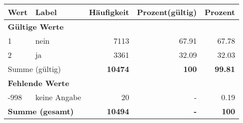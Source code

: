      \begin{longtable}{lXrrr}
     \toprule
     \textbf{Wert} & \textbf{Label} & \textbf{Häufigkeit} & \textbf{Prozent(gültig)} & \textbf{Prozent} \\
     \endhead
     \midrule
     \multicolumn{5}{l}{\textbf{Gültige Werte}}\\

     1 &
     \multicolumn{1}{X}{ nein   } &


       \num{7113} &
       \num[round-mode=places,round-precision=2]{67.91} &
         \num[round-mode=places,round-precision=2]{67.78} \\

     2 &
     \multicolumn{1}{X}{ ja   } &


       \num{3361} &
       \num[round-mode=places,round-precision=2]{32.09} &
         \num[round-mode=places,round-precision=2]{32.03} \\
     \midrule
     \multicolumn{2}{l}{Summe (gültig)} &
       \textbf{\num{10474}} &
     \textbf{\num{100}} &
       \textbf{\num[round-mode=places,round-precision=2]{99.81}} \\
     \multicolumn{5}{l}{\textbf{Fehlende Werte}}\\
       -998 &
       keine Angabe &
         \num{20} &
        - &
         \num[round-mode=places,round-precision=2]{0.19} \\
     \midrule
     \multicolumn{2}{l}{\textbf{Summe (gesamt)}} &
          \textbf{\num{10494}} &
        \textbf{-} &
        \textbf{\num{100}} \\
     \bottomrule
     \end{longtable}
     
